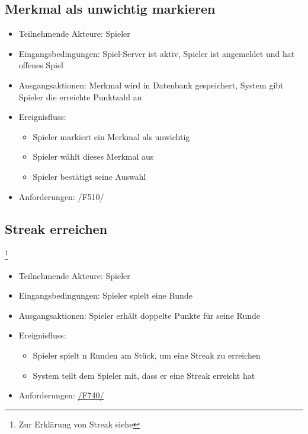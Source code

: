 \documentclass[a4paper]{scrreprt}
\begin{document}
	\subsection{Merkmal als unwichtig markieren}
	\begin{itemize}
		\item Teilnehmende Akteure: \Gls{Spieler}
		\item Eingangsbedingungen: \Gls{Spiel-Server} ist aktiv, \Gls{Spieler} ist angemeldet und hat offenes Spiel
		\item Ausgangsaktionen: \Gls{Merkmal} wird in Datenbank gespeichert, System gibt \Gls{Spieler} die erreichte Punktzahl an
		\item Ereignisfluss:
		\begin{itemize}
			\item \Gls{Spieler} markiert ein \Gls{Merkmal} als unwichtig
			\item \Gls{Spieler} wählt dieses \Gls{Merkmal} aus
			\item \Gls{Spieler} bestätigt seine Auswahl
		\end{itemize}
		\item Anforderungen: /F510/
	\end{itemize}
     
    \subsection{Streak erreichen}\footnote{Zur Erklärung von Streak siehe }
    \begin{itemize}
        \item Teilnehmende Akteure: \Gls{Spieler}
        \item Eingangsbedingungen: \Gls{Spieler} spielt eine Runde
        \item Ausgangsaktionen: \Gls{Spieler} erhält doppelte Punkte für seine Runde
        \item Ereignisfluss:
        \begin{itemize}
            \item \Gls{Spieler} spielt n Runden am Stück, um eine Streak zu erreichen
            \item System teilt dem \Gls{Spieler} mit, dass er eine Streak erreicht hat
        \end{itemize}
        \item Anforderungen: \hyperlink{F740}{/F740/}
    \end{itemize}
    
\end{document}
